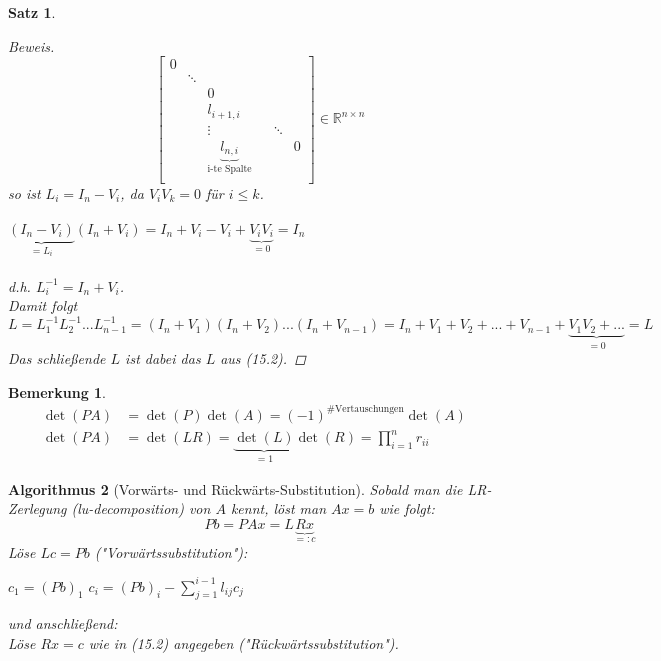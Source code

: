 \documentclass[12pt]{article}
\theoremstyle{break}
\newtheorem{theorem}{Satz}[subsection]
\newtheorem{algorithm}[theorem]{Algorithmus}
\newtheorem*{comment*}{Bemerkung}
\begin{document}
\begin{theorem}
\begin{proof}[Beweis]
$$\begin{bmatrix}
0 \\
& \ddots \\
&& 0 \\
&& l_{i+1,i} &  \\
&& \vdots &&\ddots&\\
&& \underbrace{l_{n,i}}_{\text{i-te Spalte}} &&&0 \\
\end{bmatrix}
\in \mathbb{R}^{n\times n}$$
so ist $L_i = I_n - V_i$, da $V_iV_k = 0$ für $i \leq k$.\\\\
$\underbrace{(I_n - V_i)}_{=L_i} (I_n + V_i) = I_n + V_i - V_i + \underbrace{V_iV_i}_{=0} = I_n$\\\\
d.h. $L_i^{-1} = I_n + V_i$.\\
Damit folgt $L = L_1^{-1}L_2^{-1} ... L_{n-1}^{-1} = (I_n + V_1)(I_n + V_2) ... (I_n + V_{n-1}) = I_n + V_1 + V_2 +... + V_{n-1} + \underbrace{V_1V_2 + ...}_{=0} = L$\\
Das schließende $L$ ist dabei das $L$ aus (15.2).
\end{proof}
\end{theorem}

\begin{comment*}
\begin{align*}
\det(PA) &= \det(P)\det(A) = (-1)^{\text{\# Vertauschungen}} \det(A) &\\
\det(PA) &= \det(LR) = \underbrace{\det(L)}_{=1} \det(R) = \prod_{i=1}^n r_{ii}
\end{align*}
\end{comment*}

\begin{algorithm}[Vorwärts- und Rückwärts-Substitution]
Sobald man die LR-Zerlegung (lu-decomposition) von $A$ kennt, löst man $Ax = b$ wie folgt:
$$Pb = PAx = L\underbrace{Rx}_{=: c}$$
Löse $Lc = Pb$ ("Vorwärtssubstitution"):
%
\begin{algorithmic}
\STATE $c_1 = (Pb)_1$
\STATE $c_i = (Pb)_i - \sum_{j=1}^{i-1} l_{ij}c_j$
\ENDFOR
\end{algorithmic}
%
und anschließend:\\
Löse $Rx = c$ wie in (15.2) angegeben ("Rückwärtssubstitution").
\end{algorithm}
\end{document}
